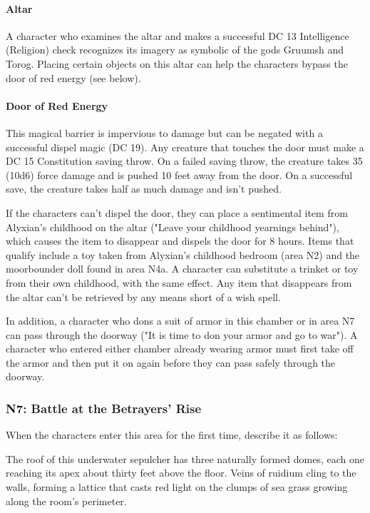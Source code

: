 \documentclass[10pt,a4paper,twoside,bg=print,twocolumn,openany,nodeprecatedcode]{dndbook}
\begin{document}
\paragraph{Altar}
A character who examines the altar and makes a successful DC 13 Intelligence (Religion) check recognizes its imagery as symbolic of the gods Gruumsh and Torog. Placing certain objects on this altar can help the characters bypass the door of red energy (see below).

\paragraph{Door of Red Energy}
This magical barrier is impervious to damage but can be negated with a successful dispel magic (DC 19). Any creature that touches the door must make a DC 15 Constitution saving throw. On a failed saving throw, the creature takes 35 (10d6) force damage and is pushed 10 feet away from the door. On a successful save, the creature takes half as much damage and isn't pushed.

If the characters can't dispel the door, they can place a sentimental item from Alyxian's childhood on the altar ("Leave your childhood yearnings behind"), which causes the item to disappear and dispels the door for 8 hours. Items that qualify include a toy taken from Alyxian's childhood bedroom (area N2) and the moorbounder doll found in area N4a. A character can substitute a trinket or toy from their own childhood, with the same effect. Any item that disappears from the altar can't be retrieved by any means short of a wish spell.

In addition, a character who dons a suit of armor in this chamber or in area N7 can pass through the doorway ("It is time to don your armor and go to war"). A character who entered either chamber already wearing armor must first take off the armor and then put it on again before they can pass safely through the doorway.




\subsubsection{N7: Battle at the Betrayers' Rise}
When the characters enter this area for the first time, describe it as follows:

\begin{DndReadAloud}{}
The roof of this underwater sepulcher has three naturally formed domes, each one reaching its apex about thirty feet above the floor. Veins of ruidium cling to the walls, forming a lattice that casts red light on the clumps of sea grass growing along the room's perimeter.

\end{DndReadAloud}
\end{document}
